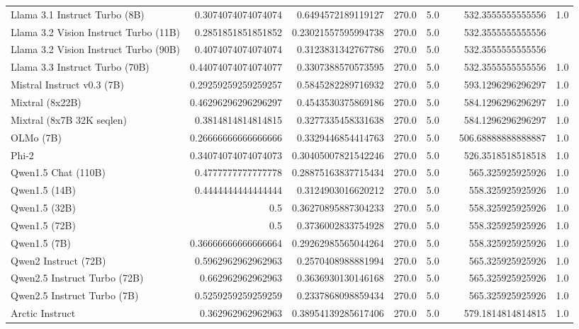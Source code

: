 \begin{table}[htp]
{\begin{tabular}{lrrrrrrr}
Llama 3.1 Instruct Turbo (8B) & 0.3074074074074074 & 0.6494572189119127 & 270.0 & 5.0 &  & 532.3555555555556 & 1.0 \\
Llama 3.2 Vision Instruct Turbo (11B) & 0.2851851851851852 & 0.23021557595994738 & 270.0 & 5.0 &  & 532.3555555555556 &  \\
Llama 3.2 Vision Instruct Turbo (90B) & 0.4074074074074074 & 0.3123831342767786 & 270.0 & 5.0 &  & 532.3555555555556 &  \\
Llama 3.3 Instruct Turbo (70B) & 0.44074074074074077 & 0.3307388570573595 & 270.0 & 5.0 &  & 532.3555555555556 & 1.0 \\
Mistral Instruct v0.3 (7B) & 0.29259259259259257 & 0.5845282289716932 & 270.0 & 5.0 &  & 593.1296296296297 & 1.0 \\
Mixtral (8x22B) & 0.46296296296296297 & 0.4543530375869186 & 270.0 & 5.0 &  & 584.1296296296297 & 1.0 \\
Mixtral (8x7B 32K seqlen) & 0.3814814814814815 & 0.3277335458331638 & 270.0 & 5.0 &  & 584.1296296296297 & 1.0 \\
OLMo (7B) & 0.26666666666666666 & 0.3329446854414763 & 270.0 & 5.0 &  & 506.68888888888887 & 1.0 \\
Phi-2 & 0.34074074074074073 & 0.30405007821542246 & 270.0 & 5.0 &  & 526.3518518518518 & 1.0 \\
Qwen1.5 Chat (110B) & 0.4777777777777778 & 0.28875163837715434 & 270.0 & 5.0 &  & 565.325925925926 & 1.0 \\
Qwen1.5 (14B) & 0.4444444444444444 & 0.3124903016620212 & 270.0 & 5.0 &  & 558.325925925926 & 1.0 \\
Qwen1.5 (32B) & 0.5 & 0.36270895887304233 & 270.0 & 5.0 &  & 558.325925925926 & 1.0 \\
Qwen1.5 (72B) & 0.5 & 0.3736002833754928 & 270.0 & 5.0 &  & 558.325925925926 & 1.0 \\
Qwen1.5 (7B) & 0.36666666666666664 & 0.29262985565044264 & 270.0 & 5.0 &  & 558.325925925926 & 1.0 \\
Qwen2 Instruct (72B) & 0.5962962962962963 & 0.2570408988881994 & 270.0 & 5.0 &  & 565.325925925926 & 1.0 \\
Qwen2.5 Instruct Turbo (72B) & 0.662962962962963 & 0.3636930130146168 & 270.0 & 5.0 &  & 565.325925925926 & 1.0 \\
Qwen2.5 Instruct Turbo (7B) & 0.5259259259259259 & 0.2337868098859434 & 270.0 & 5.0 &  & 565.325925925926 & 1.0 \\
Arctic Instruct & 0.362962962962963 & 0.38954139285617406 & 270.0 & 5.0 &  & 579.1814814814815 & 1.0 \\

\end{tabular}}
\end{table}
